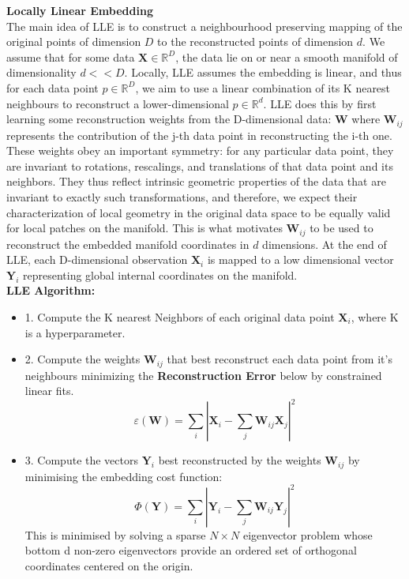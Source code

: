 \documentclass[12pt]{report}
\begin{document}
\textbf{Locally Linear Embedding} 
\\
The main idea of LLE is to construct a neighbourhood preserving mapping 
of the original points of dimension $D$ to the reconstructed points of dimension $d$. 
We assume that for some data $\textbf{X} \in \mathbb{R}^{D}$, 
the data lie on or near a smooth manifold of dimensionality $d << D$. 
Locally, LLE assumes the embedding is linear, and thus for each data point $p \in \mathbb{R}^D$, 
we aim to use a linear combination of its K nearest neighbours to reconstruct a lower-dimensional $p \in \mathbb{R}^d$. 
LLE does this by first learning some reconstruction weights from the D-dimensional data: $\textbf{W}$ 
where $\textbf{W}_{ij}$ represents the contribution of the j-th data point in reconstructing the i-th one. 
These weights obey an important symmetry: for any particular data point, 
they are invariant to rotations, rescalings, and translations of that data point and its neighbors.
They thus reflect intrinsic geometric properties of the data that are invariant to exactly such transformations,
and therefore, we expect their characterization of local geometry in the 
original data space to be equally valid for local patches on the manifold.
This is what motivates $\textbf{W}_{ij}$ to be used to reconstruct
the embedded manifold coordinates in $d$ dimensions. 
At the end of LLE, each  D-dimensional observation $\textbf{X}_i$ 
is mapped to a low dimensional vector $\textbf{Y}_i$ 
representing global internal coordinates on the manifold.\\
\textbf{LLE Algorithm:}
\begin{itemize}
    \item 1. Compute the K nearest Neighbors of each original data point $\textbf{X}_i$, where K is a hyperparameter.
    \item 2. Compute the weights $\textbf{W}_{ij}$ that best reconstruct each data point from it's neighbours minimizing the \textbf{Reconstruction Error} below by constrained linear fits.
$$\varepsilon (\textbf{W}) = \sum_i|\textbf{X}_i - \sum_j \textbf{W}_{ij} \textbf{X}_j|^2$$
    \item 3. Compute the vectors $\textbf{Y}_i$ best reconstructed by the weights $\textbf{W}_{ij}$ 
    by minimising the embedding cost function: $$\Phi(\textbf{Y}) = \sum_i |\textbf{Y}_i - \sum_j \textbf{W}_{ij}\textbf{Y}_j|^2$$
    This is minimised by solving a sparse $N \times N$ eigenvector problem whose bottom d non-zero eigenvectors provide
    an ordered set of orthogonal coordinates centered on the origin.
\end{itemize}
\end{document}
